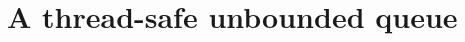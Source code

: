 \documentclass[11pt]{article}
\begin{document}

\clearpage
\maketitle
\thispagestyle{empty}

\newpage




\section{A thread-safe unbounded queue}
\end{document}
